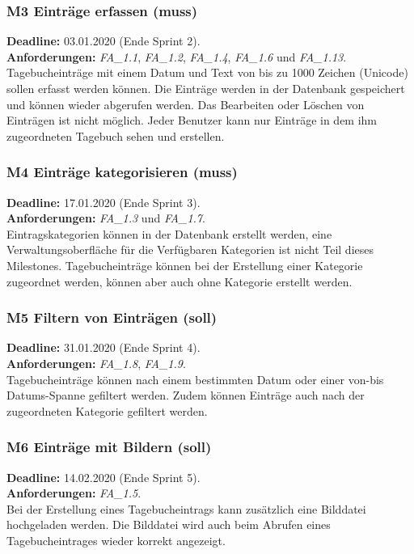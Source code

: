 \subsubsection{M3 Einträge erfassen (muss)}
\textbf{Deadline: } 03.01.2020 (Ende Sprint 2). \\
\textbf{Anforderungen: }\emph{FA\_1.1}, \emph{FA\_1.2}, \emph{FA\_1.4}, \emph{FA\_1.6} und \emph{FA\_1.13}.\\
Tagebucheinträge mit einem Datum und Text von bis zu 1000 Zeichen (Unicode) sollen erfasst werden können. Die Einträge werden in der Datenbank gespeichert und können wieder abgerufen werden. Das Bearbeiten oder Löschen von Einträgen ist nicht möglich. Jeder Benutzer kann nur Einträge in dem ihm zugeordneten Tagebuch sehen und erstellen.

\subsubsection{M4 Einträge kategorisieren (muss)}
\textbf{Deadline: } 17.01.2020 (Ende Sprint 3). \\
\textbf{Anforderungen: }\emph{FA\_1.3} und \emph{FA\_1.7}.\\
Eintragskategorien können in der Datenbank erstellt werden, eine Verwaltungsoberfläche für die Verfügbaren Kategorien ist nicht Teil dieses Milestones. Tagebucheinträge können bei der Erstellung einer Kategorie zugeordnet werden, können aber auch ohne Kategorie erstellt werden.

\subsubsection{M5 Filtern von Einträgen (soll)}
\textbf{Deadline: } 31.01.2020 (Ende Sprint 4). \\
\textbf{Anforderungen: }\emph{FA\_1.8}, \emph{FA\_1.9}.\\
Tagebucheinträge können nach einem bestimmten Datum oder einer von-bis Datums-Spanne gefiltert werden. Zudem können Einträge auch nach der zugeordneten Kategorie gefiltert werden.

\subsubsection{M6 Einträge mit Bildern (soll)}
\textbf{Deadline: } 14.02.2020 (Ende Sprint 5). \\
\textbf{Anforderungen: }\emph{FA\_1.5}.\\
Bei der Erstellung eines Tagebucheintrags kann zusätzlich eine Bilddatei hochgeladen werden. Die Bilddatei wird auch beim Abrufen eines Tagebucheintrages wieder korrekt angezeigt.

